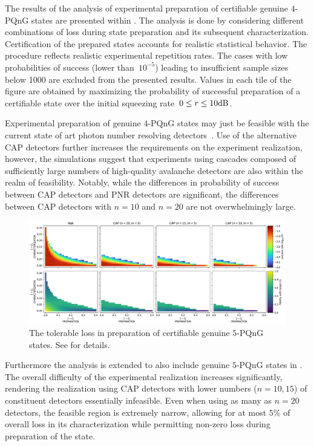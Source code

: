 \documentclass{article}
\begin{document}
The results of the analysis of experimental preparation of certifiable genuine $4$-PQnG states are presented within . The analysis is done by considering different combinations of loss during state preparation and its subsequent characterization. Certification of the prepared states accounts for realistic statistical behavior. The procedure reflects realistic experimental repetition rates. The cases with low probabilities of success (lower than~$10^{-5}$) leading to insufficient sample sizes below 1000 are excluded from the presented results. Values in each tile of the figure are obtained by maximizing the probability of successful preparation of a certifiable state over the initial squeezing rate~${0 \leq r \leq 10\mathrm{dB}}$.

Experimental preparation of genuine $4$-PQnG states may just be feasible with the current state of art photon number resolving detectors~\cite{endo2021,endo2024}. Use of the alternative CAP detectors further increases the requirements on the experiment realization, however, the simulations suggest that experiments using cascades composed of sufficiently large numbers of high-quality avalanche detectors are also within the realm of feasibility. Notably, while the differences in probability of success between CAP detectors and PNR detectors are significant, the differences between CAP detectors with $n = 10$ and $n = 20$ are not overwhelmingly large.

\begin{figure}[h]
  \begin{center}
    \includegraphics[width = \columnwidth]{import/202411/paper_unified_05.pdf}
  \end{center}
  \caption{
    The tolerable loss in preparation of certifiable genuine $5$-PQnG states. See  for details.
  }
  \label{f-res-5}
\end{figure}

Furthermore the analysis is extended to also include genuine $5$-PQnG states in . The overall difficulty of the experimental realization increases significantly, rendering the realization using CAP detectors with lower numbers (${n = 10, 15}$) of constituent detectors essentially infeasible. Even when using as many as $n = 20$ detectors, the feasible region is extremely narrow, allowing for at most $5\%$ of overall loss in its characterization while permitting non-zero loss during preparation of the state.
\end{document}
